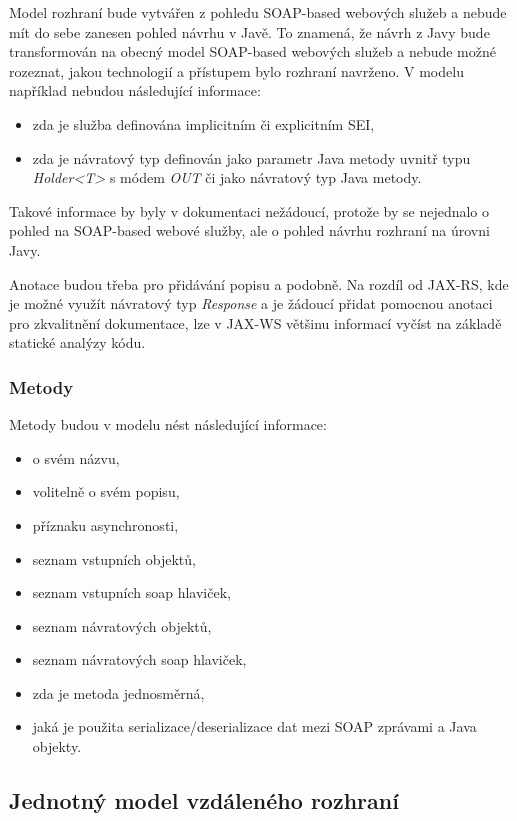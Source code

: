 \documentclass[11pt,twoside,a4paper]{book}
\begin{document}
Model rozhraní bude vytvářen z pohledu SOAP-based
webových služeb a nebude mít do sebe zanesen pohled návrhu v Javě. To
znamená, že návrh z Javy bude transformován na obecný model SOAP-based webových
služeb a nebude možné rozeznat, jakou technologií a přístupem bylo rozhraní
navrženo. V modelu například nebudou následující informace:

\begin{itemize}
  \item zda je služba definována implicitním či explicitním SEI,
  \item zda je návratový typ definován jako parametr Java metody uvnitř typu
  {\em Holder<T>} s módem {\em OUT} či jako návratový typ Java metody.
\end{itemize}

Takové informace by byly v dokumentaci nežádoucí, protože by se nejednalo o
pohled na SOAP-based webové služby, ale o pohled návrhu rozhraní na úrovni Javy.

Anotace budou třeba pro přidávání popisu a podobně. Na rozdíl od JAX-RS, kde je
možné využít návratový typ {\em Response} a je žádoucí přidat pomocnou anotaci
pro zkvalitnění dokumentace, lze v JAX-WS většinu informací vyčíst na základě
statické analýzy kódu.

\subsubsection{Metody}

Metody budou v modelu nést následující informace:

\begin{itemize}
  \item o svém názvu,
  \item volitelně o svém popisu,
  \item příznaku asynchronosti,
  \item seznam vstupních objektů,
  \item seznam vstupních soap hlaviček,
  \item seznam návratových objektů,
  \item seznam návratových soap hlaviček,
  \item zda je metoda jednosměrná,
  \item jaká je použita serializace/deserializace dat mezi SOAP zprávami a Java objekty.
\end{itemize}

\subsection{Jednotný model vzdáleného rozhraní}
\label{subsec:jednotny-model-vzdaleneho-rozhrani}
\end{document}
